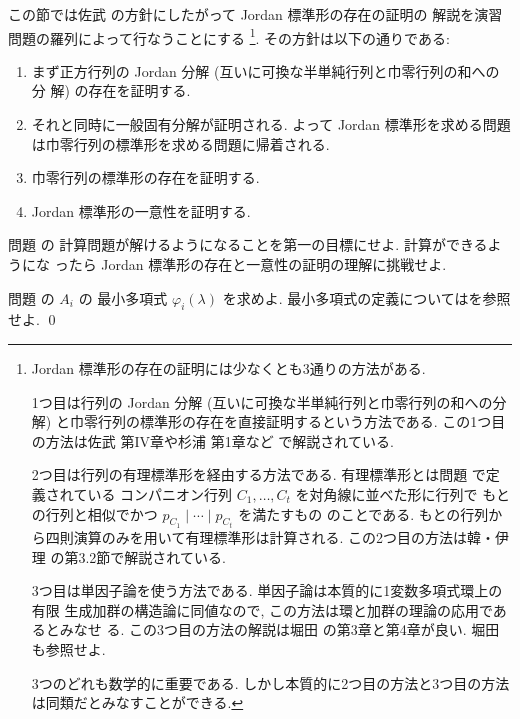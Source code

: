 \documentclass[12pt,twoside]{jarticle}
\begin{document}
この節では佐武 \cite{satake} の方針にしたがって Jordan 標準形の存在の証明の
解説を演習問題の羅列によって行なうことにする%
\footnote{Jordan 標準形の存在の証明には少なくとも3通りの方法がある. 

  1つ目は行列の Jordan 分解 (互いに可換な半単純行列と巾零行列の和への分解)
  と巾零行列の標準形の存在を直接証明するという方法である.  
  この1つ目の方法は佐武 \cite{satake} 第IV章や杉浦 \cite{sugiura} 第1章など
  で解説されている. 

  2つ目は行列の有理標準形を経由する方法である.
  有理標準形とは問題  で定義されている
  コンパニオン行列 $C_1,\dots,C_t$ を対角線に並べた形に行列で
  もとの行列と相似でかつ $p_{C_1}\mid\cdots\mid p_{C_t}$ を満たすもの
  のことである.  もとの行列から四則演算のみを用いて有理標準形は計算される.
  この2つ目の方法は韓・伊理 \cite{kan-iri} の第3.2節で解説されている.

  3つ目は単因子論を使う方法である.  単因子論は本質的に1変数多項式環上の有限
  生成加群の構造論に同値なので, この方法は環と加群の理論の応用であるとみなせ
  る.  この3つ目の方法の解説は堀田 \cite{10wa} の第3章と第4章が良い.
  堀田 \cite{gun-kagun} も参照せよ.

  3つのどれも数学的に重要である.
  しかし本質的に2つ目の方法と3つ目の方法は同類だとみなすことができる.
  }.
その方針は以下の通りである:
\begin{enumerate}
\item まず正方行列の Jordan 分解 (互いに可換な半単純行列と巾零行列の和への分
  解) の存在を証明する.
\item それと同時に一般固有分解が証明される.  
  よって Jordan 標準形を求める問題は巾零行列の標準形を求める問題に帰着される.
\item 巾零行列の標準形の存在を証明する.
\item Jordan 標準形の一意性を証明する.
\end{enumerate}

\bigskip

問題  の
計算問題が解けるようになることを第一の目標にせよ.  計算ができるようにな
ったら Jordan 標準形の存在と一意性の証明の理解に挑戦せよ.

\begin{question}
  \label{q:Jordan-normal-form-example-plus}
  問題  の $A_i$ の
  最小多項式 $\varphi_i(\lambda)$ を求めよ.
  最小多項式の定義についてはを参照せよ. 
  \qed
\end{question}
\end{document}
